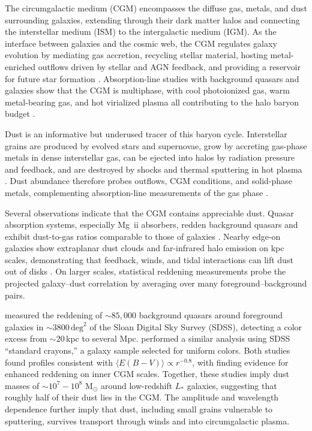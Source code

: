 \documentclass[linenumbers, twocolumn]{aastex701}
\begin{document}
The circumgalactic medium (CGM) encompasses the diffuse gas, metals, and dust surrounding galaxies, extending through their dark matter halos and connecting the interstellar medium (ISM) to the intergalactic medium (IGM).
As the interface between galaxies and the cosmic web, the CGM regulates galaxy evolution by mediating gas accretion, recycling stellar material, hosting metal-enriched outflows driven by stellar and AGN feedback, and providing a reservoir for future star formation \citep{tumlinson2017}.
Absorption-line studies with background quasars and galaxies show that the CGM is multiphase, with cool photoionized gas, warm metal-bearing gas, and hot virialized plasma all contributing to the halo baryon budget \citep{maller2004,tumlinson2011,werk2014,faerman2017}.

Dust is an informative but underused tracer of this baryon cycle.
Interstellar grains are produced by evolved stars and supernovae, grow by accreting gas-phase metals in dense interstellar gas, can be ejected into halos by radiation pressure and feedback, and are destroyed by shocks and thermal sputtering in hot plasma \citep{draine2003,dwek1998,galliano2018,draine1979,draine1979destruction,dwek1992}.
Dust abundance therefore probes outflows, CGM conditions, and solid-phase metals, complementing absorption-line measurements of the gas phase \citep{otsuki2024}.

Several observations indicate that the CGM contains appreciable dust.
Quasar absorption systems, especially Mg~{\sc ii} absorbers, redden background quasars and exhibit dust-to-gas ratios comparable to those of galaxies \citep{york2006,menard2008,menard2012}.
Nearby edge-on galaxies show extraplanar dust clouds and far-infrared halo emission on kpc scales, demonstrating that feedback, winds, and tidal interactions can lift dust out of disks \citep{howk1999,yoon2021}.
On larger scales, statistical reddening measurements probe the projected galaxy--dust correlation by averaging over many foreground--background pairs.

\citet{menard2010} measured the reddening of $\sim85,000$ background quasars around foreground galaxies in $\sim 3800\,\text{deg}^2$ of the Sloan Digital Sky Survey (SDSS), detecting a color excess from $\sim20$\,kpc to several Mpc.
\citet{peek2015} performed a similar analysis using SDSS ``standard crayons,'' a galaxy sample selected for uniform colors.
Both studies found profiles consistent with $\langle E(B-V) \rangle \propto r^{-0.8}$, with \citet{peek2015} finding evidence for enhanced reddening on inner CGM scales.
Together, these studies imply dust masses of $\sim 10^7 - 10^8$ M$_\odot$ around low-redshift $L_*$ galaxies, suggesting that roughly half of their dust lies in the CGM.
The amplitude and wavelength dependence further imply that dust, including small grains vulnerable to sputtering, survives transport through winds and into circumgalactic plasma.
\end{document}
